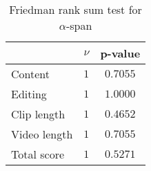 \begin{table}[ht]
	\begin{center}
	\caption{Friedman rank sum test for $\alpha$-span}
	\label{tab:fried_alpha}
		\begin{tabular}{lcc}
		\toprule
			 & $\nu$ & p-value\\
			\midrule
			Content & $1$ & $0.7055$\\
			Editing & $1$ & $1.0000$\\
			Clip length & $1$ & $0.4652$\\
			Video length & $1$ & $0.7055$\\
			Total score & $1$ & $0.5271$\\
		\bottomrule
		\end{tabular}
	\end{center}
\end{table}